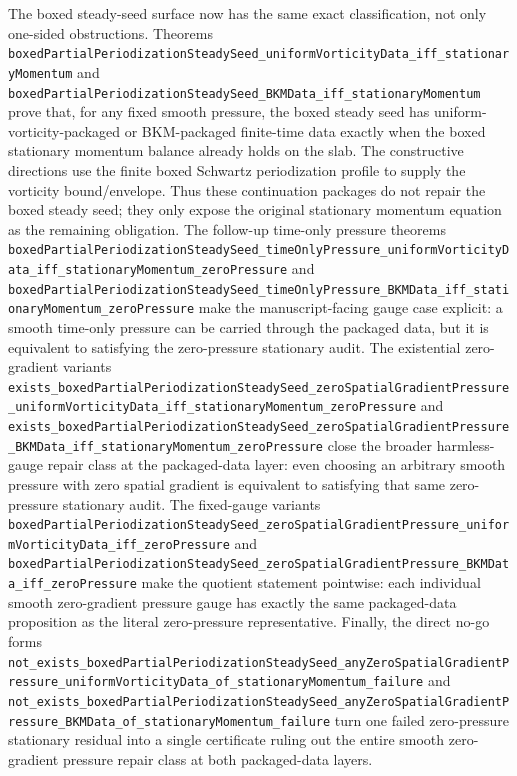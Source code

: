 \documentclass[11pt]{article}
\theoremstyle{remark}
\begin{document}
The boxed steady-seed surface now has the same exact classification, not only
one-sided obstructions.  Theorems
\texttt{boxedPartialPeriodizationSteadySeed\_uniformVorticityData\_iff\_stationaryMomentum}
and
\texttt{boxedPartialPeriodizationSteadySeed\_BKMData\_iff\_stationaryMomentum}
prove that, for any fixed smooth pressure, the boxed steady seed has
uniform-vorticity-packaged or BKM-packaged finite-time data exactly when the
boxed stationary momentum balance already holds on the slab.  The constructive
directions use the finite boxed Schwartz periodization profile to supply the
vorticity bound/envelope.  Thus these continuation packages do not repair the
boxed steady seed; they only expose the original stationary momentum equation
as the remaining obligation.  The follow-up time-only pressure theorems
\texttt{boxedPartialPeriodizationSteadySeed\_timeOnlyPressure\_uniformVorticityData\_iff\_stationaryMomentum\_zeroPressure}
and
\texttt{boxedPartialPeriodizationSteadySeed\_timeOnlyPressure\_BKMData\_iff\_stationaryMomentum\_zeroPressure}
make the manuscript-facing gauge case explicit: a smooth time-only pressure can
be carried through the packaged data, but it is equivalent to satisfying the
zero-pressure stationary audit.  The existential zero-gradient variants
\texttt{exists\_boxedPartialPeriodizationSteadySeed\_zeroSpatialGradientPressure\_uniformVorticityData\_iff\_stationaryMomentum\_zeroPressure}
and
\texttt{exists\_boxedPartialPeriodizationSteadySeed\_zeroSpatialGradientPressure\_BKMData\_iff\_stationaryMomentum\_zeroPressure}
close the broader harmless-gauge repair class at the packaged-data layer: even
choosing an arbitrary smooth pressure with zero spatial gradient is equivalent
to satisfying that same zero-pressure stationary audit.  The fixed-gauge
variants
\texttt{boxedPartialPeriodizationSteadySeed\_zeroSpatialGradientPressure\_uniformVorticityData\_iff\_zeroPressure}
and
\texttt{boxedPartialPeriodizationSteadySeed\_zeroSpatialGradientPressure\_BKMData\_iff\_zeroPressure}
make the quotient statement pointwise: each individual smooth zero-gradient
pressure gauge has exactly the same packaged-data proposition as the literal
zero-pressure representative.  Finally, the direct no-go forms
\texttt{not\_exists\_boxedPartialPeriodizationSteadySeed\_anyZeroSpatialGradientPressure\_uniformVorticityData\_of\_stationaryMomentum\_failure}
and
\texttt{not\_exists\_boxedPartialPeriodizationSteadySeed\_anyZeroSpatialGradientPressure\_BKMData\_of\_stationaryMomentum\_failure}
turn one failed zero-pressure stationary residual into a single certificate
ruling out the entire smooth zero-gradient pressure repair class at both
packaged-data layers.
\end{document}
